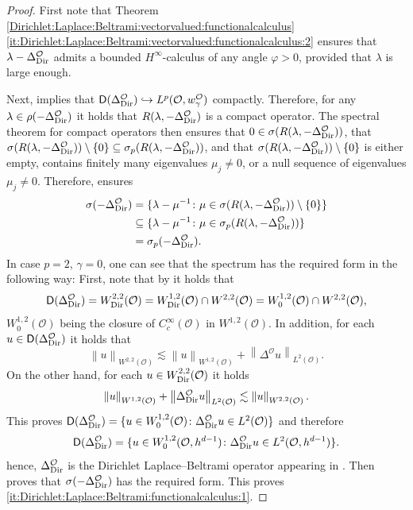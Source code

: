 \documentclass[12pt,a4paper, reqno]{amsart}
\theoremstyle{plain}
\theoremstyle{definition}
\theoremstyle{remark}
\numberwithin{equation}{section}
\newcommand{\1}{\mathbbm{1}}
\newcommand{\calO}{\ensuremath{\mathcal{O}}}
\newcommand{\sfD}{\ensuremath{\mathsf{D}}}
\newcommand{\Dir}{\textup{Dir}}
\newcommand{\nrm}[1]{\left\lVert #1 \right\rVert}
\begin{document}
 \begin{proof}
     First note that Theorem \ref{Dirichlet:Laplace:Beltrami:vectorvalued:functionalcalculus}\ref{it:Dirichlet:Laplace:Beltrami:vectorvalued:functionalcalculus:2} ensures that $\lambda-\Delta^\calO_\Dir$ admits a bounded $H^\infty$-calculus of any angle $\varphi>0$, provided that $\lambda$ is large enough. 

     Next, \cite[Theorem 8.8]{OpicGurka1989} implies that $\sfD(\Delta^\calO_\Dir)\hookrightarrow L^p(\calO,w_\gamma^\calO)$ compactly. Therefore, for any $\lambda\in \rho(-\Delta^\calO_\Dir)$ it holds that $R(\lambda, -\Delta^\calO_\Dir)$ is a compact operator. 
     The spectral theorem for compact operators then ensures that $0 \in \sigma(R(\lambda,-\Delta^\calO_\Dir))$, that  $ \sigma(R(\lambda,-\Delta^\calO_\Dir))\setminus\{0\}\subseteq \sigma_p(R(\lambda,-\Delta^\calO_\Dir))$, and that $\sigma(R(\lambda,-\Delta^\calO_\Dir))\setminus\{0\}$ is either empty, contains finitely many eigenvalues $\mu_j\neq 0$, or a null sequence of eigenvalues $\mu_j \neq 0$. 
     Therefore, \cite[Theorem IV.1.13(ii)]{EngelNagel_Evo} ensures 
          \[\begin{aligned}
              \sigma(-\Delta^\calO_\Dir)&=\{\lambda -\mu^{-1}\colon \mu \in \sigma(R(\lambda,-\Delta^\calO_\Dir))\setminus\{0\}\}\\
              &\subseteq \{\lambda -\mu^{-1}\colon \mu \in \sigma_p(R(\lambda,-\Delta^\calO_\Dir))\}\\
              &=\sigma_p(-\Delta^\calO_\Dir).
          \end{aligned}\]
    In case $p=2$, $\gamma=0$, one can see that the spectrum has the required form in the following way:
    First, note that by \cite[Proposition 3.8]{LindemulderVeraar2020} it holds that 
    \[\sfD(\Delta^\calO_\Dir)=W_\Dir^{2,2}(\calO)=W^{1,2}_\Dir(\calO)\cap W^{2,2}(\calO)= W_0^{1,2}(\calO)\cap W^{2,2}(\calO),\]
    $W_0^{1,2}(\calO)$ being the closure of $C_c^\infty(\calO)$ in $W^{1,2}(\calO).$
     In addition, for each $u\in \sfD(\Delta^\calO_\Dir)$ it holds that 
    \[ \nrm{u}_{W^{2,2}(\calO)}\lesssim \nrm{u}_{W^{1,2}(\calO)}+ \nrm{\Delta^\calO u}_{L^2(\calO)}.\]
    On the other hand, for each $u\in W_\Dir^{2,2}(\calO)$ it holds 
    \[ \nrm{u}_{W^{1,2}(\calO)}+ \nrm{\Delta^\calO_\Dir u}_{L^2(\calO)} \lesssim \nrm{u}_{W^{2,2}(\calO)}.\]
    This proves $\sfD(\Delta^\calO_\Dir)= \{u\in W_0^{1,2}(\calO)\colon \Delta^\calO_\Dir u \in L^2(\calO)\}$ and therefore
    \[\sfD(\Delta^\calO_\Dir)= \{u\in W_0^{1,2}(\calO,h^{d-1})\colon \Delta^\calO_\Dir u \in L^2(\calO, h^{d-1})\}.\]
hence, $\Delta^\calO_\Dir$ is the Dirichlet Laplace--Beltrami operator appearing in \cite[Section 4.2]{Grigoryan2009_Book}. Then \cite[Theorem 10.20 \& Theorem 10.22]{Grigoryan2009_Book} proves that $\sigma(-\Delta^\calO_\Dir)$ has the required form. This proves \ref{it:Dirichlet:Laplace:Beltrami:functionalcalculus:1}.
    

\end{proof}
\end{document}
